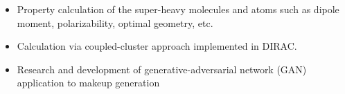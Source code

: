 \begin{itemize}
    \item Property calculation of the super-heavy molecules and atoms such as dipole moment, polarizability, optimal geometry, etc.
    \item Calculation via coupled-cluster approach implemented in DIRAC.
\end{itemize}

\begin{itemize}
    \item Research and development of generative-adversarial network (GAN) application to makeup generation
\end{itemize}

\cvproject{}